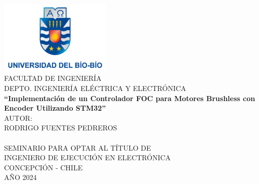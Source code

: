 \documentclass[11pt]{report}
\begin{document}
\begin{titlepage}
	\begin{center}
		\includegraphics[width=0.4\textwidth]{imagenes/logo_ubb.png}\\
		\normalsize FACULTAD DE INGENIERÍA\\
		DEPTO. INGENIERÍA ELÉCTRICA Y ELECTRÓNICA\\[2cm]

		\LARGE \textbf{``Implementación de un Controlador FOC para Motores Brushless con Encoder Utilizando STM32''}\\[6cm]

		\normalsize AUTOR:\\
		RODRIGO FUENTES PEDREROS\\
		\href{https://www.youtube.com/watch?v=dQw4w9WgXcQ}{\phantom{ASDF}}\\[2cm]

		SEMINARIO PARA OPTAR AL TÍTULO DE\\
		INGENIERO DE EJECUCIÓN EN ELECTRÓNICA\\[1cm]

		CONCEPCIÓN - CHILE\\
		AÑO 2024\\
	\end{center}
\end{titlepage}
\end{document}
